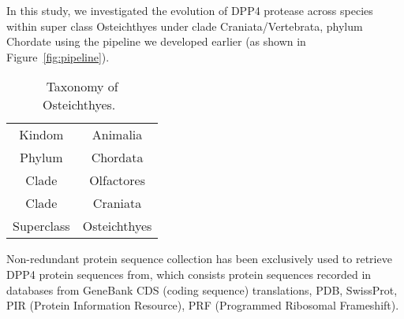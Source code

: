 In this study, we investigated the evolution of DPP4 protease across species within super class Osteichthyes under clade Craniata/Vertebrata, phylum Chordate using the pipeline we developed earlier (as shown in Figure~\ref{fig:pipeline}). 

\begin{table} 
\caption{Taxonomy of Osteichthyes.~\cite{18563158}} 
\centering
    \begin{tabular}{| c | c |}
    \hline
        Kindom & Animalia \\ 
        Phylum & Chordata \\ 
        Clade & Olfactores \\ 
        Clade & Craniata \\ 
        Superclass &  Osteichthyes\\ 
    \hline
    \end{tabular} 
\end{table}

Non-redundant protein sequence collection has been exclusively used to retrieve DPP4 protein sequences from, which consists protein sequences recorded in databases from GeneBank CDS (coding sequence) translations, PDB, SwissProt, PIR (Protein Information Resource), PRF (Programmed Ribosomal Frameshift). 